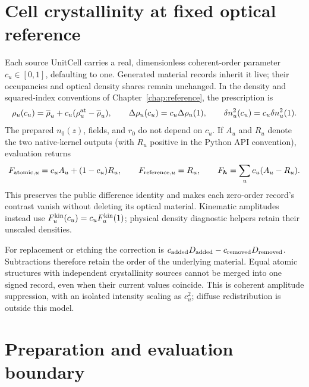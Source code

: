 \section{Cell crystallinity at fixed optical reference}

Each source UnitCell carries a real, dimensionless coherent-order parameter
$c_u\in[0,1]$, defaulting to one. Generated material records inherit it live;
their occupancies and optical density shares remain unchanged. In the
density and squared-index conventions of Chapter~\ref{chap:reference},
the prescription is
\begin{equation}
  \rho_u(c_u)=\overline\rho_u+
      c_u(\rho_u^{\rm at}-\overline\rho_u),
  \qquad
  \Delta\rho_u(c_u)=c_u\Delta\rho_u(1),
  \qquad
  \delta n_u^2(c_u)=c_u\delta n_u^2(1).
\end{equation}
The prepared $n_0(z)$, fields, and $r_0$ do not depend on $c_u$.
If $A_u$ and $R_u$ denote the two native-kernel outputs (with $R_u$
positive in the Python API convention), evaluation returns
\begin{equation}
  F_{{\rm atomic},u}=c_u A_u+(1-c_u)R_u,
  \qquad F_{{\rm reference},u}=R_u,
  \qquad F_{\bm h}=\sum_u c_u(A_u-R_u).
\end{equation}
This preserves the public difference identity and makes each zero-order
record's contrast vanish without deleting its optical material. Kinematic
amplitudes instead use $F_u^{\rm kin}(c_u)=c_u F_u^{\rm kin}(1)$;
physical density diagnostic helpers retain their unscaled densities.

For replacement or etching the correction is
$c_{\rm added}D_{\rm added}-c_{\rm removed}D_{\rm removed}$.
Subtractions therefore retain the order of the underlying material.
Equal atomic structures with independent crystallinity sources cannot be
merged into one signed record, even when their current values coincide.
This is coherent amplitude suppression, with an isolated intensity scaling
as $c_u^2$; diffuse redistribution is outside this model.

\section{Preparation and evaluation boundary}

